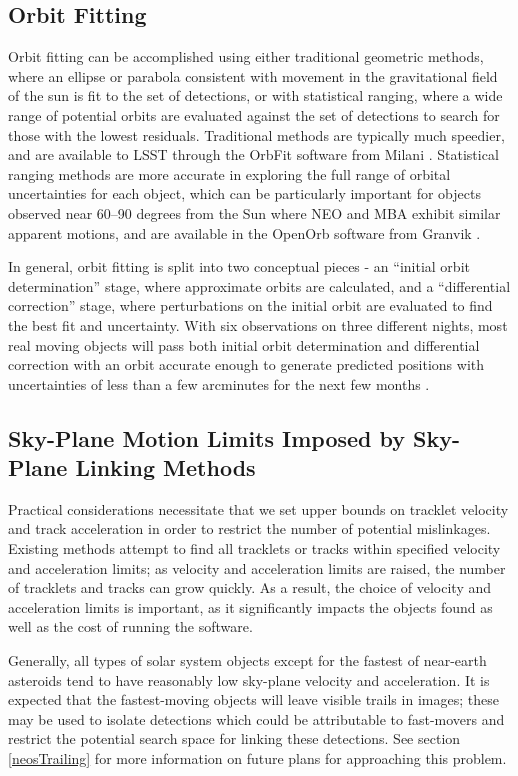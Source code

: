 \subsection{Orbit Fitting}
\label{orbitFitting}

Orbit fitting can be accomplished using either traditional geometric
methods, where an ellipse or parabola consistent with movement in the
gravitational field of the sun is fit to the set of detections, or
with statistical ranging, where a wide range of potential orbits are
evaluated against the set of detections to search for those with
the lowest residuals. Traditional methods are typically much speedier,
and are available to LSST through the OrbFit software from Milani
\citep{Milani2006}. Statistical ranging methods are more accurate in
exploring the full range of orbital uncertainties for each object,
which can be particularly important for objects observed near 60--90
degrees from the Sun where NEO and MBA exhibit similar apparent
motions, and are available in the OpenOrb software from Granvik
\citep{OpenOrb2009}.

In general, orbit fitting is split into two conceptual pieces - an
``initial orbit determination'' stage, where approximate orbits are
calculated, and a ``differential correction'' stage, where
perturbations on the initial orbit are evaluated to find the best fit
and uncertainty. With six observations on three different nights, most
real moving objects will pass both initial orbit determination and
differential correction with an orbit accurate enough to generate
predicted positions with uncertainties of less than a few arcminutes
for the next few months \citep{basicSolarSystem}.





\subsection{Sky-Plane Motion Limits Imposed by Sky-Plane Linking Methods}

Practical considerations necessitate that we set upper bounds on
tracklet velocity and track acceleration in order to restrict the
number of potential mislinkages. Existing methods attempt to find all
tracklets or tracks within specified velocity and acceleration limits;
as velocity and acceleration limits are raised, the number of
tracklets and tracks can grow quickly.  As a result, the choice of
velocity and acceleration limits is important, as it significantly
impacts the objects found as well as the cost of running the software.

Generally, all types of solar system objects except for the fastest of
near-earth asteroids tend to have reasonably low sky-plane velocity
and acceleration. It is expected that the fastest-moving objects will
leave visible trails in images; these may be used to isolate
detections which could be attributable to fast-movers and restrict the
potential search space for linking these detections.  See section
\ref{neosTrailing} for more information on future plans for
approaching this problem.  

